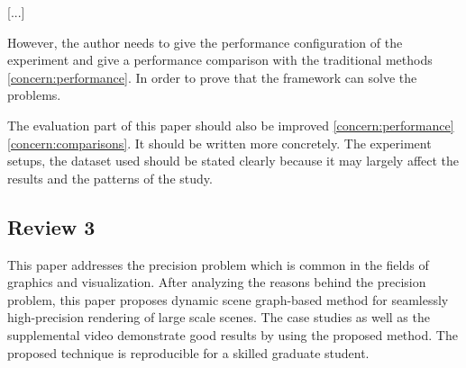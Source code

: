 \documentclass{article}
\begin{document}
[...]

However, the author needs to give the performance configuration of the experiment and give a performance comparison with the traditional methods \eqref{concern:performance}. 
In order to prove that the framework can solve the problems.
    
The evaluation part of this paper should also be improved \eqref{concern:performance} \eqref{concern:comparisons}.
It should be written more concretely.
The experiment setups, the dataset used should be stated clearly because it may largely affect the results and the patterns of the study.

\subsection*{Review 3}

This paper addresses the precision problem which is common in the fields of graphics and visualization.
After analyzing the reasons behind the precision problem, this paper proposes dynamic scene graph-based method for seamlessly high-precision rendering of large scale scenes.
The case studies as well as the supplemental video demonstrate good results by using the proposed method.
The proposed technique is reproducible for a skilled graduate student.
\end{document}
